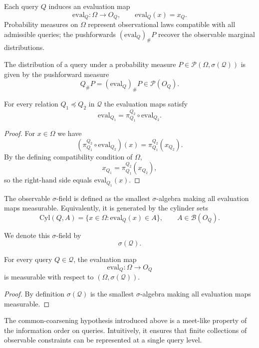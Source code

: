 Each query $Q$ induces an evaluation map
\[
\mathrm{eval}_Q : \Omega \to O_Q, \qquad \mathrm{eval}_Q(x) = x_Q.
\]
Probability measures on $\Omega$ represent observational laws compatible
with all admissible queries; the pushforwards $(\mathrm{eval}_Q)_\#P$
recover the observable marginal distributions.

The distribution of a query under a probability measure
$P \in \mathcal P(\Omega,\sigma(\mathcal Q))$
is given by the pushforward measure
\[
Q_\# P
=
(\mathrm{eval}_Q)_\# P
\in
\mathcal P(O_Q).
\]

\begin{lemma}
\label{lem:proj-compat}
For every relation $Q_1 \preceq Q_2$ in $\mathcal Q$ the evaluation maps
satisfy
\[
\mathrm{eval}_{Q_1}
=
\pi^{Q_2}_{Q_1}
\circ
\mathrm{eval}_{Q_2}.
\]
\end{lemma}

\begin{proof}
For $x\in\Omega$ we have
\[
(\pi^{Q_2}_{Q_1}\circ\mathrm{eval}_{Q_2})(x)
=
\pi^{Q_2}_{Q_1}(x_{Q_2}).
\]
By the defining compatibility condition of $\Omega$,
\[
x_{Q_1}=\pi^{Q_2}_{Q_1}(x_{Q_2}),
\]
so the right-hand side equals $\mathrm{eval}_{Q_1}(x)$.
\end{proof}

The observable $\sigma$-field is defined as the smallest
$\sigma$-algebra making all evaluation maps measurable.
Equivalently, it is generated by the cylinder sets
\[
\mathrm{Cyl}(Q,A)
=
\{x\in\Omega : \mathrm{eval}_Q(x)\in A\},
\qquad
A\in\mathcal B(O_Q).
\]

We denote this $\sigma$-field by
\[
\sigma(\mathcal Q).
\]

\begin{lemma}
\label{lem:eval-measurable}
For every query $Q\in\mathcal Q$, the evaluation map
\[
\mathrm{eval}_Q:\Omega\to O_Q
\]
is measurable with respect to $(\Omega,\sigma(\mathcal Q))$.
\end{lemma}

\begin{proof}
By definition $\sigma(\mathcal Q)$ is the smallest
$\sigma$-algebra making all evaluation maps measurable.
\end{proof}

The common-coarsening hypothesis introduced above is a meet-like
property of the information order on queries. Intuitively, it ensures
that finite collections of observable constraints can be represented at
a single query level.

